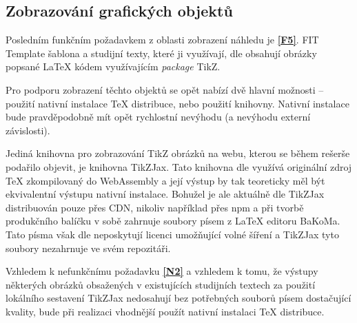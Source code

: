 \subsection{Zobrazování grafických objektů}
\label{zobrazovani-grafickych-objektu}

Posledním funkčním požadavkem z oblasti zobrazení náhledu je \textbf{\ref{F5}}. FIT Template šablona a studijní texty,
které ji využívají, dle \cite{woowoo, pkm} obsahují obrázky popsané \LaTeX{} kódem využívajícím \textit{package} TikZ.

Pro podporu zobrazení těchto objektů se opět nabízí dvě hlavní možnosti – použití nativní instalace \TeX{} distribuce,
nebo použití knihovny. Nativní instalace bude pravděpodobně mít opět rychlostní nevýhodu (a nevýhodu externí
závislosti).

Jediná knihovna pro zobrazování TikZ obrázků na webu, kterou se během rešerše podařilo objevit, je knihovna TikZJax.
Tato knihovna dle \cite{tikzjax-github} využívá originální zdroj \TeX{} zkompilovaný do WebAssembly a její výstup by tak
teoreticky měl být ekvivalentní výstupu nativní instalace. Bohužel je ale aktuálně dle \cite{tikzjax-github} TikZJax
distribuován pouze přes CDN, nikoliv například přes npm a při tvorbě produkčního balíčku v sobě zahrnuje soubory písem z
\LaTeX{} editoru BaKoMa. Tato písma však dle \cite{bakoma-fonts-ctan} neposkytují licenci umožňující volné šíření a
TikZJax tyto soubory nezahrnuje \cite{tikzjax-github} ve svém repozitáři.

Vzhledem k nefunkčnímu požadavku \textbf{\ref{N2}} a vzhledem k tomu, že výstupy některých obrázků obsažených v
existujících studijních textech \cite{pkm} za použití lokálního sestavení TikZJax nedosahují bez potřebných souborů
písem dostačující kvality, bude při realizaci vhodnější použít nativní instalaci \TeX{} distribuce.
